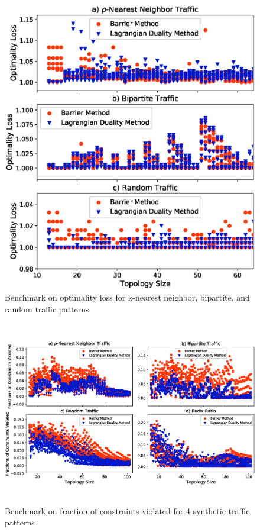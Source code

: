 \documentclass[sigconf]{acmart}
\theoremstyle{definition}
\begin{document}
\begin{figure}[t]
\vspace{-0.5cm}
    \centering
    \includegraphics[trim={1cm 2.3cm 0.3cm 1.05cm},width=\linewidth,scale=1]{./figures/optimality_loss.eps}
    \caption{Benchmark on optimality loss for k-nearest neighbor, bipartite, and random traffic patterns}
    \label{optimality_loss_benchmark}
\end{figure}

\begin{figure}[t]
    \includegraphics[trim={1cm 1.2cm 1cm 4cm}, width=1.\linewidth, height=8cm,scale=1.3]{./figures/constraints_violated.eps}
    \vspace{-1.3cm}
    \caption{Benchmark on fraction of constraints violated for 4 synthetic traffic patterns}
    \label{constraints_violation_benchmark}
\end{figure}
\end{document}
